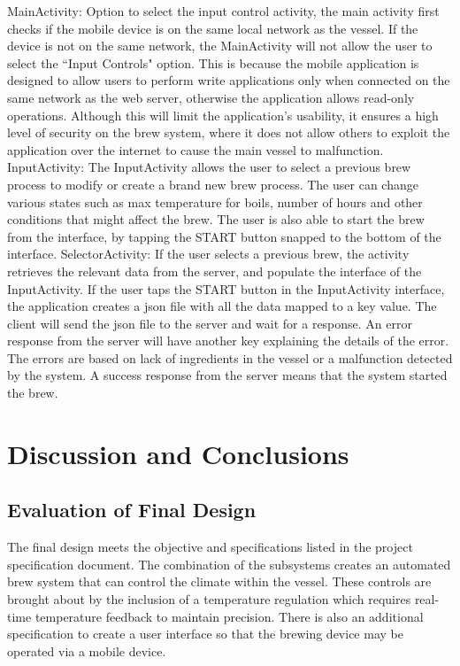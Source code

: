 \documentclass{article}
\begin{document}
MainActivity: Option to select the input control activity, the main activity first checks if the mobile device is on the same local network as the vessel. If the device is not on the same network, the MainActivity will not allow the user to select the ``Input Controls" option. This is because the mobile application is designed to allow users to perform write applications only when connected on the same network as the web server, otherwise the application allows read-only operations. Although this will limit the application's usability, it ensures a high level of security on the brew system, where it does not allow others to exploit the application over the internet to cause the main vessel to malfunction. 
InputActivity: The InputActivity allows the user to select a previous brew process to modify or create a brand new brew process. The user can change various states such as max temperature for boils, number of hours and other conditions that might affect the brew. The user is also able to start the brew from the interface, by tapping the START button snapped to the bottom of the interface.
SelectorActivity: If the user selects a previous brew, the activity retrieves the relevant data from the server, and populate the interface of the InputActivity.
If the user taps the START button in the InputActivity interface, the application creates a \gls{json} file with all the data mapped to a key value. The client will send the \gls{json} file to the server and wait for a response. An error response from the server will have another key explaining the details of the error. The errors are based on lack of ingredients in the vessel or a malfunction detected by the system. A success response from the server means that the system started the brew.


\section{Discussion and Conclusions}
\subsection{Evaluation of Final Design}
The final design meets the objective and specifications listed in the project specification document. The combination of the subsystems creates an automated brew system that can control the climate within the vessel.  These controls are brought about by the inclusion of a temperature regulation which requires real-time temperature feedback to maintain precision. There is also an additional specification to create a user interface so that the brewing device may be operated via a mobile device.
\end{document}
